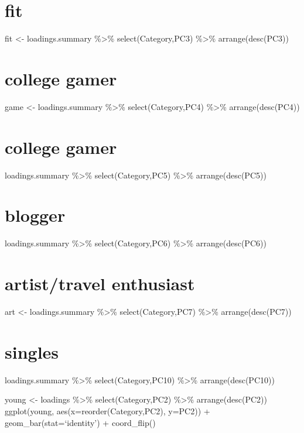\documentclass[
]{article}
\begin{document}
\hypertarget{fit}{%
\section{fit}\label{fit}}

fit \textless- loadings.summary \%\textgreater\% select(Category,PC3)
\%\textgreater\% arrange(desc(PC3))

\hypertarget{college-gamer}{%
\section{college gamer}\label{college-gamer}}

game \textless- loadings.summary \%\textgreater\% select(Category,PC4)
\%\textgreater\% arrange(desc(PC4))

\hypertarget{college-gamer-1}{%
\section{college gamer}\label{college-gamer-1}}

loadings.summary \%\textgreater\% select(Category,PC5) \%\textgreater\%
arrange(desc(PC5))

\hypertarget{blogger}{%
\section{blogger}\label{blogger}}

loadings.summary \%\textgreater\% select(Category,PC6) \%\textgreater\%
arrange(desc(PC6))

\hypertarget{artisttravel-enthusiast}{%
\section{artist/travel enthusiast}\label{artisttravel-enthusiast}}

art \textless- loadings.summary \%\textgreater\% select(Category,PC7)
\%\textgreater\% arrange(desc(PC7))

\hypertarget{singles}{%
\section{singles}\label{singles}}

loadings.summary \%\textgreater\% select(Category,PC10) \%\textgreater\%
arrange(desc(PC10))

young \textless- loadings \%\textgreater\% select(Category,PC2)
\%\textgreater\% arrange(desc(PC2)) ggplot(young,
aes(x=reorder(Category,PC2), y=PC2)) + geom\_bar(stat=`identity') +
coord\_flip()
\end{document}
